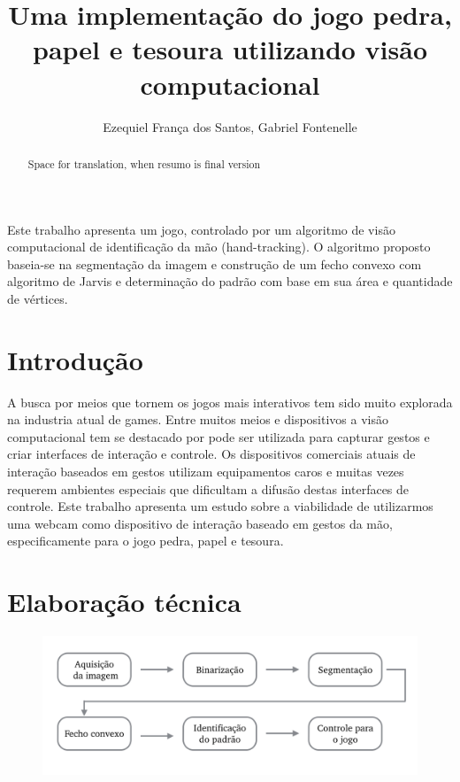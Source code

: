 \documentclass[12pt]{article}
\title{Uma implementação do jogo pedra, papel e tesoura utilizando visão computacional}
\author{Ezequiel França dos Santos\inst{1}, Gabriel Fontenelle\inst{1}}
\begin{document}
 
\maketitle

\begin{abstract}
Space for translation, when resumo is final version %
\end{abstract}
     
\begin{resumo} 
Este trabalho apresenta um jogo, controlado por um algoritmo de visão computacional de identificação da mão (hand-tracking). O algoritmo proposto baseia-se na segmentação da imagem e construção de um fecho convexo com algoritmo de Jarvis e determinação do padrão com base em sua área e quantidade de vértices.
\end{resumo}


\section{Introdução}

A busca por meios que tornem os jogos mais interativos tem sido muito explorada na industria atual de games. Entre muitos meios e dispositivos a visão computacional tem se destacado por pode ser utilizada para capturar gestos e criar interfaces de interação e controle. Os dispositivos comerciais atuais de interação baseados em gestos utilizam equipamentos caros e
muitas vezes requerem ambientes especiais que dificultam a difusão destas interfaces de controle.
Este trabalho apresenta um estudo sobre a viabilidade de utilizarmos uma webcam como dispositivo de interação baseado em gestos da mão, especificamente para o jogo pedra, papel e tesoura.

\section{Elaboração técnica}

\begin{figure}[ht]
\centering
\includegraphics[width=.7\textwidth]{fluxo.png}
\label{fig:fig}
\end{figure}
\end{document}

